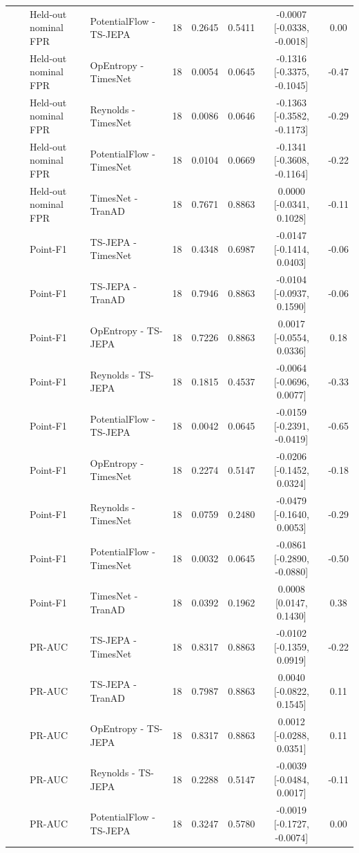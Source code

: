 {\begin{longtable}{@{}llllccccc@{}}
 &  & Held-out nominal FPR & PotentialFlow - TS-JEPA & 18 & 0.2645 & 0.5411 & -0.0007 [-0.0338, -0.0018] & 0.00 \\
 &  & Held-out nominal FPR & OpEntropy - TimesNet & 18 & 0.0054 & 0.0645 & -0.1316 [-0.3375, -0.1045] & -0.47 \\
 &  & Held-out nominal FPR & Reynolds - TimesNet & 18 & 0.0086 & 0.0646 & -0.1363 [-0.3582, -0.1173] & -0.29 \\
 &  & Held-out nominal FPR & PotentialFlow - TimesNet & 18 & 0.0104 & 0.0669 & -0.1341 [-0.3608, -0.1164] & -0.22 \\
 &  & Held-out nominal FPR & TimesNet - TranAD & 18 & 0.7671 & 0.8863 & 0.0000 [-0.0341, 0.1028] & -0.11 \\
 &  & Point-F1 & TS-JEPA - TimesNet & 18 & 0.4348 & 0.6987 & -0.0147 [-0.1414, 0.0403] & -0.06 \\
 &  & Point-F1 & TS-JEPA - TranAD & 18 & 0.7946 & 0.8863 & -0.0104 [-0.0937, 0.1590] & -0.06 \\
 &  & Point-F1 & OpEntropy - TS-JEPA & 18 & 0.7226 & 0.8863 & 0.0017 [-0.0554, 0.0336] & 0.18 \\
 &  & Point-F1 & Reynolds - TS-JEPA & 18 & 0.1815 & 0.4537 & -0.0064 [-0.0696, 0.0077] & -0.33 \\
 &  & Point-F1 & PotentialFlow - TS-JEPA & 18 & 0.0042 & 0.0645 & -0.0159 [-0.2391, -0.0419] & -0.65 \\
 &  & Point-F1 & OpEntropy - TimesNet & 18 & 0.2274 & 0.5147 & -0.0206 [-0.1452, 0.0324] & -0.18 \\
 &  & Point-F1 & Reynolds - TimesNet & 18 & 0.0759 & 0.2480 & -0.0479 [-0.1640, 0.0053] & -0.29 \\
 &  & Point-F1 & PotentialFlow - TimesNet & 18 & 0.0032 & 0.0645 & -0.0861 [-0.2890, -0.0880] & -0.50 \\
 &  & Point-F1 & TimesNet - TranAD & 18 & 0.0392 & 0.1962 & 0.0008 [0.0147, 0.1430] & 0.38 \\
 &  & PR-AUC & TS-JEPA - TimesNet & 18 & 0.8317 & 0.8863 & -0.0102 [-0.1359, 0.0919] & -0.22 \\
 &  & PR-AUC & TS-JEPA - TranAD & 18 & 0.7987 & 0.8863 & 0.0040 [-0.0822, 0.1545] & 0.11 \\
 &  & PR-AUC & OpEntropy - TS-JEPA & 18 & 0.8317 & 0.8863 & 0.0012 [-0.0288, 0.0351] & 0.11 \\
 &  & PR-AUC & Reynolds - TS-JEPA & 18 & 0.2288 & 0.5147 & -0.0039 [-0.0484, 0.0017] & -0.11 \\
 &  & PR-AUC & PotentialFlow - TS-JEPA & 18 & 0.3247 & 0.5780 & -0.0019 [-0.1727, -0.0074] & 0.00 \\

\end{longtable}}

